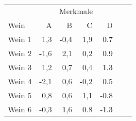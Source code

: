 \begin{tabular}{lrrrrrr}
    \toprule
    & \multicolumn{4}{c}{Merkmale} \\
    \cmidrule(lr){2-5}
    Wein & A & B & C & D \\ 
    \midrule
    Wein 1 & 1,3 & -0,4 & 1,9 & 0.7 \\
    Wein 2 & -1,6 & 2,1 & 0,2 & 0.9 \\
    Wein 3 & 1,2 & 0,7 & 0,4 & 1.3 \\
    Wein 4 & -2,1 & 0,6 & -0,2 & 0.5 \\
    Wein 5 & 0,8 & 0,6 & 1,1 & -0.8 \\
    Wein 6 & -0,3 & 1,6 & 0.8 & -1.3 \\
    \bottomrule
\end{tabular}